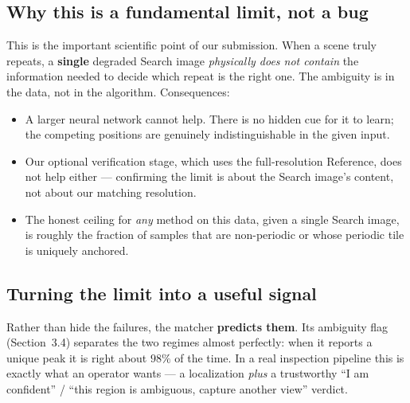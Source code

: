 \documentclass[11pt]{article}
\newcommand{\term}[1]{\textbf{\color{klablue}#1}}
\begin{document}
\begin{center}
\end{center}

\subsection{Why this is a fundamental limit, not a bug}
This is the important scientific point of our submission. When a scene truly
repeats, a \term{single} degraded Search image \emph{physically does not
contain} the information needed to decide which repeat is the right one. The
ambiguity is in the data, not in the algorithm. Consequences:

\begin{itemize}[leftmargin=1.4em]
  \item A larger neural network cannot help. There is no hidden cue for it to
        learn; the competing positions are genuinely indistinguishable in the
        given input.
  \item Our optional verification stage, which uses the full-resolution
        Reference, does not help either --- confirming the limit is about the
        Search image's content, not about our matching resolution.
  \item The honest ceiling for \emph{any} method on this data, given a single
        Search image, is roughly the fraction of samples that are non-periodic
        or whose periodic tile is uniquely anchored.
\end{itemize}

\subsection{Turning the limit into a useful signal}
Rather than hide the failures, the matcher \term{predicts them}. Its
ambiguity flag (Section~3.4) separates the two regimes almost perfectly: when
it reports a unique peak it is right about $98\%$ of the time. In a real
inspection pipeline this is exactly what an operator wants --- a localization
\emph{plus} a trustworthy ``I am confident'' / ``this region is ambiguous,
capture another view'' verdict.
\end{document}
